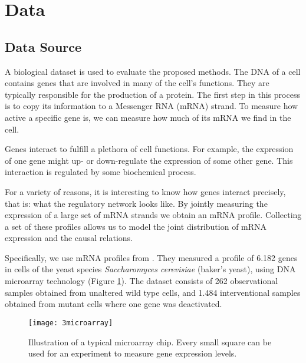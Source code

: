\newpage
\section{Data}


\subsection{Data Source}

A biological dataset is used to evaluate the proposed methods. The DNA of a cell contains genes that are involved in many of the cell's functions. They are typically responsible for the production of a protein. The first step in this process is to copy its information to a Messenger RNA (mRNA) strand. To measure how active a specific gene is, we can measure how much of its mRNA we find in the cell.

Genes interact to fulfill a plethora of cell functions. For example, the expression of one gene might up- or down-regulate the expression of some other gene. This interaction is regulated by some biochemical process. 

For a variety of reasons, it is interesting to know how genes interact precisely, that is: what the regulatory network looks like. By jointly measuring the expression of a large set of mRNA strands we obtain an mRNA profile. Collecting a set of these profiles allows us to model the joint distribution of mRNA expression and the causal relations.

Specifically, we use mRNA profiles from \citet{kemmeren2014large}. They measured a profile of 6.182 genes in cells of the yeast species \textit{Saccharomyces cerevisiae} (baker's yeast), using DNA microarray technology (Figure \ref{fig:3:microarray}). The dataset consists of 262 observational samples obtained from unaltered wild type cells, and 1.484 interventional samples obtained from mutant cells where one gene was deactivated.

\begin{figure}[h]
    \centering
    \texttt{[image: 3microarray]}
    \caption{Illustration of a typical microarray chip. Every small square can be used for an experiment to measure gene expression levels.\protect\footnotemark}
    \label{fig:3:microarray}
\end{figure}


